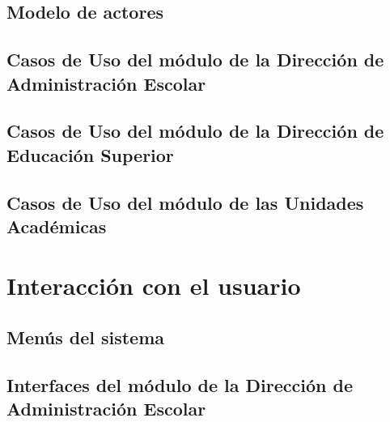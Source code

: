 \documentclass[10pt]{book}
\begin{document}
        \chapter{Modelo de actores}
        \label{ch:actores}
        
        

        \chapter{Casos de Uso del módulo de la Dirección de Administración Escolar}
        \label{ch:CUpInscripcionesDAE}
        
        
        \chapter{Casos de Uso del módulo de la Dirección de Educación Superior}
        \label{ch:CUpInscripcionesDES}
        
        
        \chapter{Casos de Uso del módulo de las Unidades Académicas}
		\label{ch:CUpInscripcionesUA}
		
        
        \part{Interacción con el usuario}
        \label{ch:Interaccion}
        
        
        \chapter{Menús del sistema}
        \label{ch:menus}
        

        \chapter{Interfaces del módulo de la Dirección de Administración Escolar}
        \label{ch:subsistemaDAE}
        	
        
\end{document}
